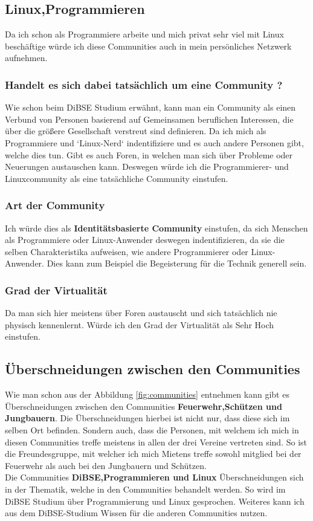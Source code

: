 \documentclass[12pt]{article}
\begin{document}
\subsection{Linux,Programmieren}
Da ich schon als Programmiere arbeite und mich privat sehr viel mit Linux beschäftige würde ich diese Communities auch in mein persönliches Netzwerk aufnehmen.
\subsubsection{Handelt es sich dabei tatsächlich um eine Community ?}
Wie schon beim DiBSE Studium erwähnt, kann man ein Community als einen Verbund von Personen basierend auf Gemeinsamen beruflichen Interessen, die über die größere Gesellschaft verstreut sind definieren. Da ich mich als Programmiere und `Linux-Nerd` indentifiziere und es auch andere Personen gibt, welche dies tun. Gibt es auch Foren, in welchen man sich über Probleme oder Neuerungen austauschen kann. Deswegen würde ich die Programmierer- und Linuxcommunity als eine tatsächliche Community einstufen.
\subsubsection{Art der Community}
Ich würde dies als \textbf{Identitätsbasierte Community} einstufen, da sich Menschen als Programmiere oder Linux-Anwender deswegen indentifizieren, da sie die selben Charakteristika aufweisen, wie andere Programmierer oder Linux-Anwender. Dies kann zum Beispiel die Begeisterung für die Technik generell sein.
\subsubsection{Grad der Virtualität}
Da man sich hier meistens über Foren austauscht und sich tatsächlich nie physisch kennenlernt. Würde ich den Grad der Virtualität als Sehr Hoch einstufen.
\subsection{Überschneidungen zwischen den Communities}
Wie man schon aus der Abbildung \ref{fig:communities} entnehmen kann gibt es Überschneidungen zwischen den Communities \textbf{Feuerwehr,Schützen und Jungbauern}. Die Überschneidungen hierbei ist nicht nur, dass diese sich im selben Ort befinden. Sondern auch, dass die Personen, mit welchem ich mich in diesen Communities treffe meistens in allen der drei Vereine vertreten sind. So ist die Freundesgruppe, mit welcher ich mich Mietens treffe sowohl mitglied bei der Feuerwehr als auch bei den Jungbauern und Schützen.\\
Die Communities \textbf{DiBSE,Programmieren und Linux} Überschneidungen sich in der Thematik, welche in den Communities behandelt werden. So wird im DiBSE Studium über Programmierung und Linux gesprochen. Weiteres kann ich aus dem DiBSE-Studium Wissen für die anderen Communities nutzen.
\pagebreak
\end{document}

